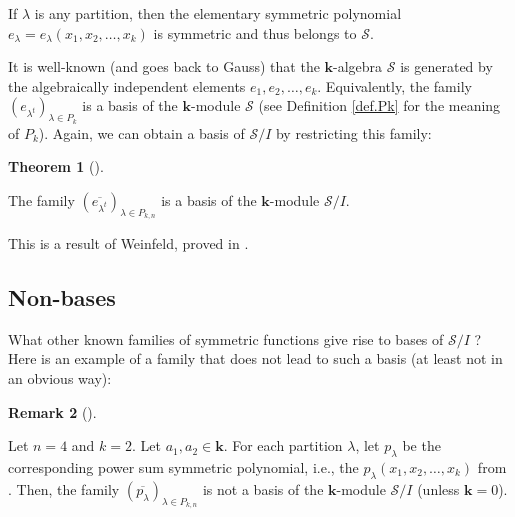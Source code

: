 \documentclass[numbers=enddot,12pt,final,onecolumn,notitlepage]{scrartcl}%
\theoremstyle{definition}
\newtheorem{theo}{Theorem}[section]
\newenvironment{theorem}[1][]
{\begin{theo}[#1]\begin{leftbar}}
{\end{leftbar}\end{theo}}
\newtheorem{remk}[theo]{Remark}
\newenvironment{remark}[1][]
{\begin{remk}[#1]\begin{leftbar}}
{\end{leftbar}\end{remk}}
\begin{document}
If $\lambda$ is any partition, then the elementary symmetric polynomial
$e_{\lambda}=e_{\lambda}\left(  x_{1},x_{2},\ldots,x_{k}\right)  $ is
symmetric and thus belongs to $\mathcal{S}$.

It is well-known (and goes back to Gauss) that the $\mathbf{k}$-algebra
$\mathcal{S}$ is generated by the algebraically independent elements
$e_{1},e_{2},\ldots,e_{k}$. Equivalently, the family $\left(  e_{\lambda^{t}%
}\right)  _{\lambda\in P_{k}}$ is a basis of the $\mathbf{k}$-module
$\mathcal{S}$ (see Definition \ref{def.Pk} for the meaning of $P_{k}$). Again,
we can obtain a basis of $\mathcal{S}/I$ by restricting this family:

\begin{theorem}
\label{thm.S/J-e-basis}The family $\left(  \overline{e_{\lambda^{t}}}\right)
_{\lambda\in P_{k,n}}$ is a basis of the $\mathbf{k}$-module $\mathcal{S}/I$.
\end{theorem}

This is a result of Weinfeld, proved in \cite[Theorem 6.2]{Weinfe19}.

\subsection{Non-bases}

What other known families of symmetric functions give rise to bases of
$\mathcal{S}/I$ ? Here is an example of a family that does not lead to such a
basis (at least not in an obvious way):

\begin{remark}
\label{rmk.S/J-p-not-basis}Let $n=4$ and $k=2$. Let $a_{1},a_{2}\in\mathbf{k}%
$. For each partition $\lambda$, let $p_{\lambda}$ be the corresponding power
sum symmetric polynomial, i.e., the $p_{\lambda}\left(  x_{1},x_{2}%
,\ldots,x_{k}\right)  $ from \cite[Definition 2.2.1]{GriRei18}. Then, the
family $\left(  \overline{p_{\lambda}}\right)  _{\lambda\in P_{k,n}}$ is not a
basis of the $\mathbf{k}$-module $\mathcal{S}/I$ (unless $\mathbf{k}=0$).
\end{remark}
\end{document}
